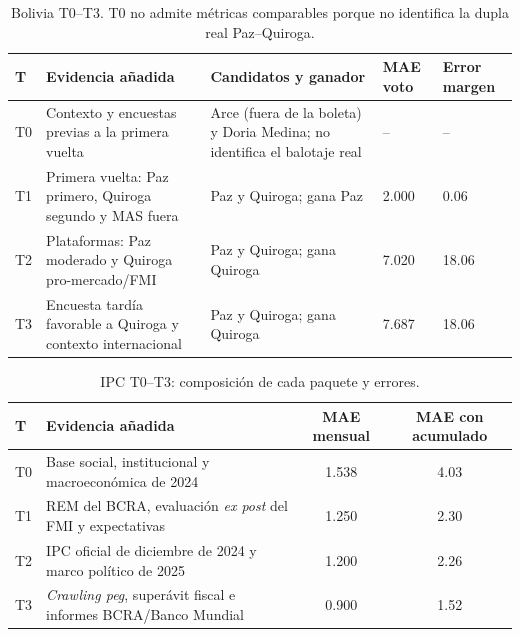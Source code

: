 \documentclass[11pt]{article}
\begin{document}
\begin{table}[H]
\centering
\small
\begin{tabular}{@{}lp{4.5cm}p{4.9cm}p{1.5cm}p{1.6cm}@{}}
\toprule
\textbf{T} & \textbf{Evidencia añadida} & \textbf{Candidatos y ganador} & \textbf{MAE voto} & \textbf{Error margen} \\
\midrule
T0 & Contexto y encuestas previas a la primera vuelta & Arce (fuera de la boleta) y Doria Medina; no identifica el balotaje real & -- & -- \\
T1 & Primera vuelta: Paz primero, Quiroga segundo y MAS fuera & Paz y Quiroga; gana Paz & 2.000 & 0.06 \\
T2 & Plataformas: Paz moderado y Quiroga pro-mercado/FMI & Paz y Quiroga; gana Quiroga & 7.020 & 18.06 \\
T3 & Encuesta tardía favorable a Quiroga y contexto internacional & Paz y Quiroga; gana Quiroga & 7.687 & 18.06 \\
\bottomrule
\end{tabular}
\caption{Bolivia T0--T3. T0 no admite métricas comparables porque no identifica la dupla real Paz--Quiroga.}
\label{tab:app_seed_bolivia}
\end{table}

\begin{table}[H]
\centering
\small
\begin{tabular}{@{}lp{9.4cm}cc@{}}
\toprule
\textbf{T} & \textbf{Evidencia añadida} & \textbf{MAE mensual} & \textbf{MAE con acumulado} \\
\midrule
T0 & Base social, institucional y macroeconómica de 2024 & 1.538 & 4.03 \\
T1 & REM del BCRA, evaluación \textit{ex post} del FMI y expectativas & 1.250 & 2.30 \\
T2 & IPC oficial de diciembre de 2024 y marco político de 2025 & 1.200 & 2.26 \\
T3 & \textit{Crawling peg}, superávit fiscal e informes BCRA/Banco Mundial & 0.900 & 1.52 \\
\bottomrule
\end{tabular}
\caption{IPC T0--T3: composición de cada paquete y errores.}
\label{tab:app_seed_ipc}
\end{table}
\end{document}
